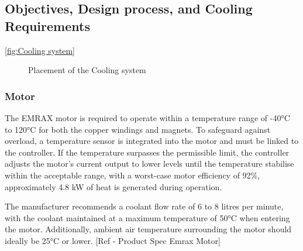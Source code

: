 \subsection{Objectives, Design process, and Cooling Requirements}
\autoref{fig:Cooling system}
\begin{figure}[ht]
  \centering
  \caption{Placement of the Cooling system}
  \label{fig:Cooling system}
\end{figure}


\subsubsection{ Motor}
The EMRAX motor is required to operate within a temperature range of -40°C to 120°C for both the copper windings and magnets. To safeguard against overload, a temperature sensor is integrated into the motor and must be linked to the controller. If the temperature surpasses the permissible limit, the controller adjusts the motor's current output to lower levels until the temperature stabilise within the acceptable range, with a worst-case motor efficiency of 92\%, approximately 4.8 kW of heat is generated during operation.

The manufacturer recommends a coolant flow rate of 6 to 8 litres per minute, with the coolant maintained at a maximum temperature of 50°C when entering the motor. Additionally, ambient air temperature surrounding the motor should ideally be 25°C or lower. [Ref - Product Spec Emrax Motor]


